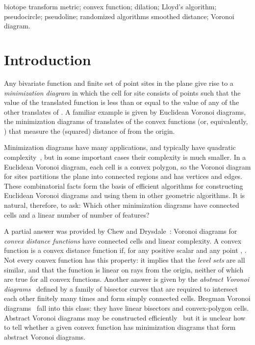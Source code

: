 \documentclass[10pt, conference, compsocconf]{IEEEtran}
\begin{document}
\begin{IEEEkeywords}
biotope transform metric;
convex function; dilation; Lloyd's algorithm;
pseudocircle; pseudoline; randomized algorithms
smoothed distance; Voronoi diagram.
\end{IEEEkeywords}

\section{Introduction}

Any bivariate function  and finite set of point sites  in the plane give rise to a \emph{minimization diagram}  in which the cell for site  consists of points  such that the value of the translated function  is less than or equal to the value of any of the other translates of . A familiar example is given by Euclidean Voronoi diagrams, the minimization diagrams of translates of the convex functions  (or, equivalently, ) that measure the (squared) distance of  from the origin.

Minimization diagrams have many applications, and typically have quadratic complexity~\cite{HalSha-DCG-94}, but in some important cases their complexity is much smaller.
In a Euclidean Voronoi diagram, each cell is a convex polygon, so the Voronoi diagram for  sites partitions the plane into  connected regions and has  vertices and edges. These combinatorial facts form the basis of efficient algorithms for constructing Euclidean Voronoi diagrams and using them in other geometric algorithms. It is natural, therefore, to ask: Which other minimization diagrams have connected cells and a linear number of number of features?

A partial answer was provided by Chew and Drysdale~\cite{CheDry-SoCG-85}:  Voronoi diagrams for \emph{convex distance functions} have connected cells and linear complexity. A convex function  is a convex distance function if, for any positive scalar  and any point , . Not every convex function has this property: it implies that the \emph{level sets}  are all similar, and that the function is linear on rays from the origin, neither of which are true for all convex functions. Another answer is given by the \emph{abstract Voronoi diagrams}~\cite{Kle-89}  defined by a family of bisector curves that are required to intersect each other finitely many times and form simply connected cells. Bregman Voronoi diagrams~\cite{NieBoiNoc-SODA-07} fall into this class: they have linear bisectors and convex-polygon cells. Abstract Voronoi diagrams may be constructed efficiently~\cite{Kle-89,KleMehMei-CGTA-93,MehMeiODu-DCG-91} but it is unclear how to tell whether a given convex function has minimization diagrams that form abstract Voronoi diagrams.
\end{document}
